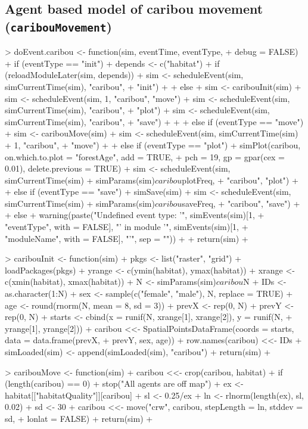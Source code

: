 \documentclass{article}
\begin{document}
\newpage

\subsection{Agent based model of caribou movement (\texttt{caribouMovement})}

\begin{Schunk}
\begin{Soutput}
> doEvent.caribou <- function(sim, eventTime, eventType, 
+     debug = FALSE) {
+     if (eventType == "init") {
+         depends <- c("habitat")
+         if (reloadModuleLater(sim, depends)) {
+             sim <- scheduleEvent(sim, simCurrentTime(sim), "caribou", 
+                 "init")
+         }
+         else {
+             sim <- caribouInit(sim)
+             sim <- scheduleEvent(sim, 1, "caribou", "move")
+             sim <- scheduleEvent(sim, simCurrentTime(sim), "caribou", 
+                 "plot")
+             sim <- scheduleEvent(sim, simCurrentTime(sim), "caribou", 
+                 "save")
+         }
+     }
+     else if (eventType == "move") {
+         sim <- caribouMove(sim)
+         sim <- scheduleEvent(sim, simCurrentTime(sim) + 1, "caribou", 
+             "move")
+     }
+     else if (eventType == "plot") {
+         simPlot(caribou, on.which.to.plot = "forestAge", add = TRUE, 
+             pch = 19, gp = gpar(cex = 0.01), delete.previous = TRUE)
+         sim <- scheduleEvent(sim, simCurrentTime(sim) + simParams(sim)$caribou$plotFreq, 
+             "caribou", "plot")
+     }
+     else if (eventType == "save") {
+         simSave(sim)
+         sim <- scheduleEvent(sim, simCurrentTime(sim) + simParams(sim)$caribou$saveFreq, 
+             "caribou", "save")
+     }
+     else {
+         warning(paste("Undefined event type: '", simEvents(sim)[1, 
+             "eventType", with = FALSE], "' in module '", simEvents(sim)[1, 
+             "moduleName", with = FALSE], "'", sep = ""))
+     }
+     return(sim)
+ }

> caribouInit <- function(sim) {
+     pkgs <- list("raster", "grid")
+     loadPackages(pkgs)
+     yrange <- c(ymin(habitat), ymax(habitat))
+     xrange <- c(xmin(habitat), xmax(habitat))
+     N <- simParams(sim)$caribou$N
+     IDs <- as.character(1:N)
+     sex <- sample(c("female", "male"), N, replace = TRUE)
+     age <- round(rnorm(N, mean = 8, sd = 3))
+     prevX <- rep(0, N)
+     prevY <- rep(0, N)
+     starts <- cbind(x = runif(N, xrange[1], xrange[2]), y = runif(N, 
+         yrange[1], yrange[2]))
+     caribou <<- SpatialPointsDataFrame(coords = starts, data = data.frame(prevX, 
+         prevY, sex, age))
+     row.names(caribou) <<- IDs
+     simLoaded(sim) <- append(simLoaded(sim), "caribou")
+     return(sim)
+ }

> caribouMove <- function(sim) {
+     caribou <<- crop(caribou, habitat)
+     if (length(caribou) == 0) 
+         stop("All agents are off map")
+     ex <- habitat[["habitatQuality"]][caribou]
+     sl <- 0.25/ex
+     ln <- rlnorm(length(ex), sl, 0.02)
+     sd <- 30
+     caribou <<- move("crw", caribou, stepLength = ln, stddev = sd, 
+         lonlat = FALSE)
+     return(sim)
+ }
\end{Soutput}
\end{Schunk}
\end{document}
